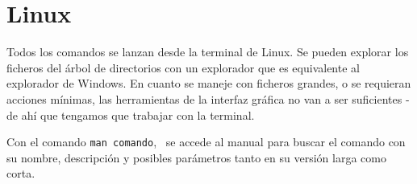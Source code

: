 \chapter{Linux}
Todos los comandos se lanzan desde la terminal de Linux. Se pueden explorar los ficheros del árbol de directorios con un explorador que es equivalente al explorador de Windows. En cuanto se maneje con ficheros grandes, o se requieran acciones mínimas, las herramientas de la interfaz gráfica no van a ser suficientes - de ahí que tengamos que trabajar con la terminal. 

Con el comando \texttt{man comando},   \ se accede al manual para buscar el comando con su nombre, descripción y posibles parámetros tanto en su versión larga como corta.


